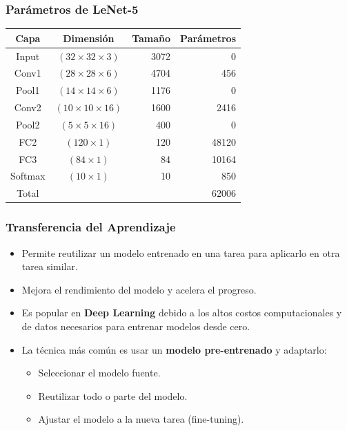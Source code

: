 \begin{frame}
    \frametitle{Parámetros de LeNet-5}
    \centering
    \begin{tabular}{ccrr}
    \toprule
    \textbf{Capa}  & \textbf{Dimensión} & \textbf{Tamaño} & \textbf{Parámetros} \\
    \midrule
    Input   & $(32 \times 32 \times 3)$   & 3072   & 0        \\
    Conv1   & $(28 \times 28 \times 6)$   & 4704   & 456      \\
    Pool1   & $(14 \times 14 \times 6)$   & 1176   & 0        \\
    Conv2   & $(10 \times 10 \times 16)$  & 1600   & 2416    \\
    Pool2   & $(5 \times 5 \times 16)$    & 400     & 0        \\
    FC2     & $(120 \times 1)$       & 120     & 48120   \\
    FC3     & $(84 \times 1)$        & 84      & 10164   \\
    Softmax & $(10 \times 1)$        & 10      & 850      \\
    \midrule
    Total &&&62006\\
    \bottomrule
    \end{tabular}

\end{frame}

\begin{frame}
    \frametitle{Transferencia del Aprendizaje}

    \begin{itemize}[leftmargin=*]
        \item Permite reutilizar un modelo entrenado en una tarea para aplicarlo en otra tarea similar.
        \item Mejora el rendimiento del modelo y acelera el progreso.
        \item Es popular en \textbf{Deep Learning} debido a los altos costos computacionales y de datos necesarios para entrenar modelos desde cero.
        \item La técnica más común es usar un \textbf{modelo pre-entrenado} y adaptarlo:
        \begin{itemize}
            \item Seleccionar el modelo fuente.
            \item Reutilizar todo o parte del modelo.
            \item Ajustar el modelo a la nueva tarea (fine-tuning).
        \end{itemize}
    \end{itemize}

\end{frame}

